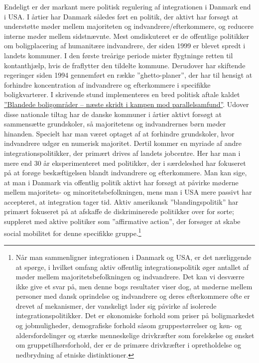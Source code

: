 \documentclass[
]{book}
\begin{document}
Endeligt er der markant mere politisk regulering af integrationen i Danmark end i USA. I årtier har Danmark således ført en politik, der aktivt har forsøgt at understøtte møder mellem majoriteten og indvandrere/efterkommere, og reducere interne møder mellem sidstnævnte. Mest omdiskuteret er de offentlige politikker om boligplacering af humanitære indvandrere, der siden 1999 er blevet spredt i landets kommuner. I den første treårige periode mister flygtninge retten til kontanthjælp, hvis de fraflytter den tildelte kommune. Derudover har skiftende regeringer siden 1994 gennemført en række ''ghetto-planer'', der har til hensigt at forhindre koncentration af indvandrere og efterkommere i specifikke boligkvarterer. I skrivende stund implementeres en bred politisk aftale kaldet \href{https://www.sm.dk/media/24475/Pjece_Blandede\%20boligomr\%C3\%A5der.pdf}{''Blandede boligområder -- næste skridt i kampen mod parallelsamfund''}. Udover disse nationale tiltag har de danske kommuner i årtier aktivt forsøgt at sammensætte grundskoler, så majoritetens og indvandrernes børn møder hinanden. Specielt har man været optaget af at forhindre grundskoler, hvor indvandrere udgør en numerisk majoritet. Dertil kommer en myriade af andre integrationspolitikker, der primært drives af landets jobcentre. Her har man i mere end 30 år eksperimenteret med politikker, der i særdeleshed har fokuseret på at forøge beskæftigelsen blandt indvandrere og efterkommere. Man kan sige, at man i Danmark via offentlig politik aktivt har forsøgt at påvirke møderne mellem majoritets- og minoritetsbefolkningen, mens man i USA mere passivt har accepteret, at integration tager tid. Aktiv amerikansk ''blandingspolitik'' har primært fokuseret på at afskaffe de diskriminerede politikker over for sorte; suppleret med aktive politiker som ''affirmative action'', der forsøger at skabe social mobilitet for denne specifikke gruppe.\footnote{Når man sammenligner integrationen i Danmark og USA, er det nærliggende at spørge, i hvilket omfang aktiv offentlig integrationspolitik øger antallet af møder mellem majoritetsbefolkningen og indvandrere. Det kan vi desværre ikke give et svar på, men denne bogs resultater viser dog, at møderne mellem personer med dansk oprindelse og indvandrere og deres efterkommere ofte er drevet af mekanismer, der vanskeligt lader sig påvirke af isolerede integrationspolitikker. Det er økonomiske forhold som priser på boligmarkedet og jobmuligheder, demografiske forhold såsom gruppestørrelser og køn- og aldersfordelinger og stærke menneskelige drivkræfter som forelskelse og ønsket om gruppetilhørsforhold, der er de primære drivkræfter i opretholdelse og nedbrydning af etniske distinktioner.}
\end{document}
